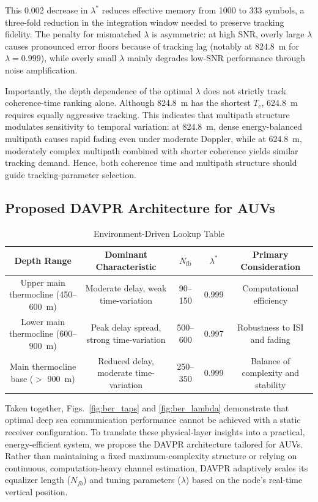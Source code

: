 \documentclass[lettersize,journal]{IEEEtran}
\begin{document}
This 0.002 decrease in $\lambda^*$ reduces effective memory from 1000 to 333 symbols, a three-fold reduction in the integration window needed to preserve tracking fidelity. The penalty for mismatched $\lambda$ is asymmetric: at high SNR, overly large $\lambda$ causes pronounced error floors because of tracking lag (notably at 824.8~m for $\lambda = 0.999$), while overly small $\lambda$ mainly degrades low-SNR performance through noise amplification.

Importantly, the depth dependence of the optimal $\lambda$ does not strictly track coherence-time ranking alone. Although 824.8~m has the shortest $T_c$, 624.8~m requires equally aggressive tracking. This indicates that multipath structure modulates sensitivity to temporal variation: at 824.8~m, dense energy-balanced multipath causes rapid fading even under moderate Doppler, while at 624.8~m, moderately complex multipath combined with shorter coherence yields similar tracking demand. Hence, both coherence time and multipath structure should guide tracking-parameter selection.

\subsection{Proposed DAVPR Architecture for AUVs}
\label{subsec:synthesis}

\begin{table}[t]
\caption{Environment-Driven Lookup Table}
\label{tab:design_principles}
\centering
\begin{tabular}{|c|c|c|c|c|}
\hline
\textbf{Depth Range} & \textbf{Dominant Characteristic} & \textbf{$N_{\mathrm{fb}}$} & \textbf{$\lambda^*$} & \textbf{Primary Consideration} \\
\hline
Upper main  thermocline  (450-- 600~m)& Moderate delay, weak time-variation & 90--150 & 0.999 & Computational efficiency \\
\hline
Lower main thermocline (600--900~m)& Peak delay spread, strong time-variation & 500--600 & 0.997 & Robustness to ISI and fading \\
\hline
Main thermocline base  ($>$ 900~m)& Reduced delay, moderate time-variation & 250--350 & 0.999 & Balance of complexity and stability \\
\hline
\end{tabular}
\end{table}


Taken together, Figs.~\ref{fig:ber_taps} and \ref{fig:ber_lambda} demonstrate that optimal deep sea communication performance cannot be achieved with a static receiver configuration. To translate these physical-layer insights into a practical, energy-efficient system, we propose the DAVPR architecture tailored for AUVs. Rather than maintaining a fixed maximum-complexity structure or relying on continuous, computation-heavy channel estimation, DAVPR adaptively scales its equalizer length ($N_{fb}$) and tuning parameters ($\lambda$) based on the node's real-time vertical position.
\end{document}

